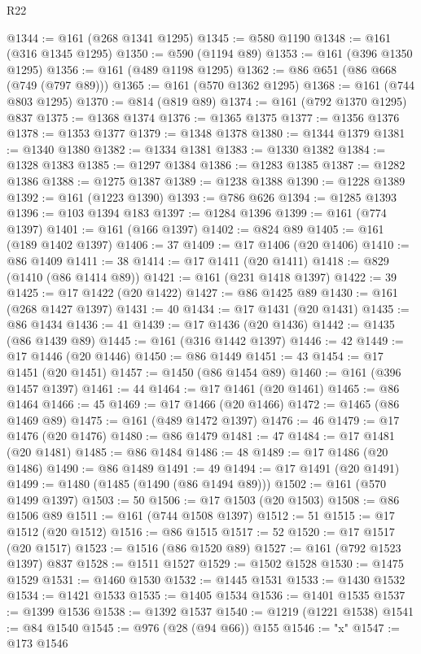 \begin{lexlean}{R22}
\begin{coremodule}
@1344 := @161 (@268 @1341 @1295)
@1345 := @580 @1190
@1348 := @161 (@316 @1345 @1295)
@1350 := @590 (@1194 @89)
@1353 := @161 (@396 @1350 @1295)
@1356 := @161 (@489 @1198 @1295)
@1362 := @86 @651 (@86 @668 (@749 (@797 @89)))
@1365 := @161 (@570 @1362 @1295)
@1368 := @161 (@744 @803 @1295)
@1370 := @814 (@819 @89)
@1374 := @161 (@792 @1370 @1295) @837
@1375 := @1368 @1374
@1376 := @1365 @1375
@1377 := @1356 @1376
@1378 := @1353 @1377
@1379 := @1348 @1378
@1380 := @1344 @1379
@1381 := @1340 @1380
@1382 := @1334 @1381
@1383 := @1330 @1382
@1384 := @1328 @1383
@1385 := @1297 @1384
@1386 := @1283 @1385
@1387 := @1282 @1386
@1388 := @1275 @1387
@1389 := @1238 @1388
@1390 := @1228 @1389
@1392 := @161 (@1223 @1390)
@1393 := @786 @626
@1394 := @1285 @1393
@1396 := @103 @1394 @183
@1397 := @1284 @1396
@1399 := @161 (@774 @1397)
@1401 := @161 (@166 @1397)
@1402 := @824 @89
@1405 := @161 (@189 @1402 @1397)
@1406 := 37
@1409 := @17 @1406 (@20 @1406)
@1410 := @86 @1409
@1411 := 38
@1414 := @17 @1411 (@20 @1411)
@1418 := @829 (@1410 (@86 @1414 @89))
@1421 := @161 (@231 @1418 @1397)
@1422 := 39
@1425 := @17 @1422 (@20 @1422)
@1427 := @86 @1425 @89
@1430 := @161 (@268 @1427 @1397)
@1431 := 40
@1434 := @17 @1431 (@20 @1431)
@1435 := @86 @1434
@1436 := 41
@1439 := @17 @1436 (@20 @1436)
@1442 := @1435 (@86 @1439 @89)
@1445 := @161 (@316 @1442 @1397)
@1446 := 42
@1449 := @17 @1446 (@20 @1446)
@1450 := @86 @1449
@1451 := 43
@1454 := @17 @1451 (@20 @1451)
@1457 := @1450 (@86 @1454 @89)
@1460 := @161 (@396 @1457 @1397)
@1461 := 44
@1464 := @17 @1461 (@20 @1461)
@1465 := @86 @1464
@1466 := 45
@1469 := @17 @1466 (@20 @1466)
@1472 := @1465 (@86 @1469 @89)
@1475 := @161 (@489 @1472 @1397)
@1476 := 46
@1479 := @17 @1476 (@20 @1476)
@1480 := @86 @1479
@1481 := 47
@1484 := @17 @1481 (@20 @1481)
@1485 := @86 @1484
@1486 := 48
@1489 := @17 @1486 (@20 @1486)
@1490 := @86 @1489
@1491 := 49
@1494 := @17 @1491 (@20 @1491)
@1499 := @1480 (@1485 (@1490 (@86 @1494 @89)))
@1502 := @161 (@570 @1499 @1397)
@1503 := 50
@1506 := @17 @1503 (@20 @1503)
@1508 := @86 @1506 @89
@1511 := @161 (@744 @1508 @1397)
@1512 := 51
@1515 := @17 @1512 (@20 @1512)
@1516 := @86 @1515
@1517 := 52
@1520 := @17 @1517 (@20 @1517)
@1523 := @1516 (@86 @1520 @89)
@1527 := @161 (@792 @1523 @1397) @837
@1528 := @1511 @1527
@1529 := @1502 @1528
@1530 := @1475 @1529
@1531 := @1460 @1530
@1532 := @1445 @1531
@1533 := @1430 @1532
@1534 := @1421 @1533
@1535 := @1405 @1534
@1536 := @1401 @1535
@1537 := @1399 @1536
@1538 := @1392 @1537
@1540 := @1219 (@1221 @1538)
@1541 := @84 @1540
@1545 := @976 (@28 (@94 @66)) @155
@1546 := "x"
@1547 := @173 @1546

\end{coremodule}
\end{lexlean}
